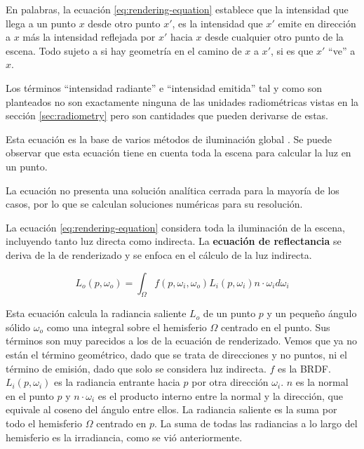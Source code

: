 En palabras, la ecuación \ref{eq:rendering-equation} establece que la intensidad que llega a un punto $x$ desde otro punto $x'$, es la intensidad que $x'$ emite en dirección a $x$ más la intensidad reflejada por $x'$ hacia $x$ desde cualquier otro punto de la escena.
Todo sujeto a si hay geometría en el camino de $x$ a $x'$, si es que $x'$ ``ve'' a $x$.

Los términos ``intensidad radiante'' e ``intensidad emitida'' tal y como son planteados no son exactamente ninguna de las unidades radiométricas vistas en la sección \ref{sec:radiometry} pero son cantidades que pueden derivarse de estas.

Esta ecuación es la base de varios métodos de iluminación global \cite{rtr}.
Se puede observar que esta ecuación tiene en cuenta toda la escena para calcular la luz en un punto.

La ecuación no presenta una solución analítica cerrada para la mayoría de los casos, por lo que se calculan soluciones numéricas para su resolución.

La ecuación \ref{eq:rendering-equation} considera toda la iluminación de la escena, incluyendo tanto luz directa como indirecta.
La \textbf{ecuación de reflectancia} se deriva de la de renderizado y se enfoca en el cálculo de la luz indirecta.

\begin{equation}\label{eq:reflectance-equation}
    L_o(p, \omega_o) = \int_{\Omega}{f(p, \omega_i, \omega_o) L_i(p, \omega_i) n \cdot \omega_i d\omega_i}
\end{equation}

Esta ecuación calcula la radiancia saliente $L_o$ de un punto $p$ y un pequeño ángulo sólido $\omega_o$ como una integral sobre el hemisferio $\Omega$ centrado en el punto.
Sus términos son muy parecidos a los de la ecuación de renderizado.
Vemos que ya no están el término geométrico, dado que se trata de direcciones y no puntos, ni el término de emisión, dado que solo se considera luz indirecta.
$f$ es la BRDF.
$L_i(p, \omega_i)$ es la radiancia entrante hacia $p$ por otra dirección $\omega_i$.
$n$ es la normal en el punto $p$ y $n \cdot \omega_i$ es el producto interno entre la normal y la dirección, que equivale al coseno del ángulo entre ellos.
La radiancia saliente es la suma por todo el hemisferio $\Omega$ centrado en $p$.
La suma de todas las radiancias a lo largo del hemisferio es la irradiancia, como se vió anteriormente.


